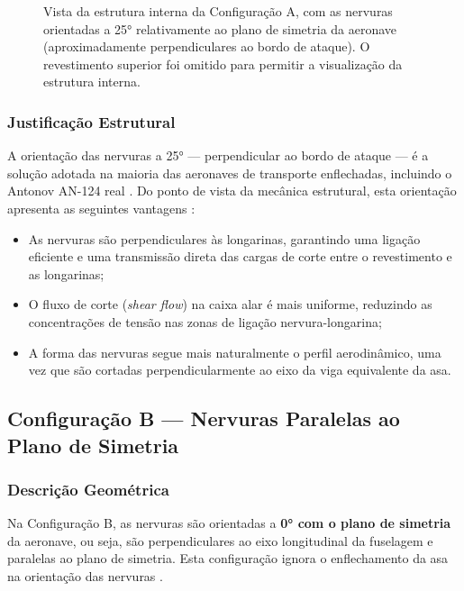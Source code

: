 \documentclass[a4paper,fleqn]{cas-sc}
\begin{document}
\begin{figure}
    \centering
    \caption{Vista da estrutura interna da Configuração A, com as nervuras orientadas a 25° relativamente ao plano de simetria da aeronave (aproximadamente perpendiculares ao bordo de ataque). O revestimento superior foi omitido para permitir a visualização da estrutura interna.}\label{fig:config_a}
\end{figure}

\subsubsection{Justificação Estrutural}

A orientação das nervuras a 25° --- perpendicular ao bordo de ataque --- é a solução adotada na maioria das aeronaves de transporte enflechadas, incluindo o Antonov AN-124 real \cite{Gordon2008, GarciaFernandez2025}. Do ponto de vista da mecânica estrutural, esta orientação apresenta as seguintes vantagens \cite{Niu1988, Megson2012}:

\begin{itemize}
    \item As nervuras são perpendiculares às longarinas, garantindo uma ligação eficiente e uma transmissão direta das cargas de corte entre o revestimento e as longarinas;
    \item O fluxo de corte (\textit{shear flow}) na caixa alar é mais uniforme, reduzindo as concentrações de tensão nas zonas de ligação nervura-longarina;
    \item A forma das nervuras segue mais naturalmente o perfil aerodinâmico, uma vez que são cortadas perpendicularmente ao eixo da viga equivalente da asa.
\end{itemize}

\subsection{Configuração B --- Nervuras Paralelas ao Plano de Simetria}

\subsubsection{Descrição Geométrica}

Na Configuração B, as nervuras são orientadas a \textbf{0° com o plano de simetria} da aeronave, ou seja, são perpendiculares ao eixo longitudinal da fuselagem e paralelas ao plano de simetria. Esta configuração ignora o enflechamento da asa na orientação das nervuras \cite{Raymer2018}.
\end{document}
